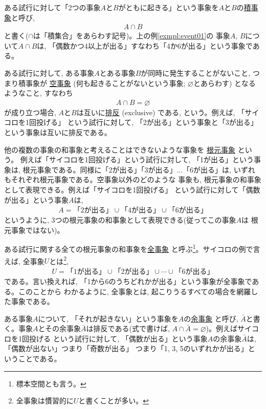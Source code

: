 ある試行に対して「2つの事象$A$と$B$がともに起きる」という事象を$A$と$B$の\underline{積事象}と呼び, 
\begin{eqnarray}A\cap B\label{eq:prodset}\end{eqnarray}
と書く($\cap$は「積集合」をあらわす記号)。上の例\ref{exmpl:event01}の
事象$A$, $B$について$A\cap B$は, 「偶数かつ4以上が出る」すなわち「4か6が出る」という事象である。

ある試行に対して, ある事象$A$とある事象$B$が同時に発生することがないこと, つまり積事象が
\underline{空事象}  (何も起きることがないという事象; $\varnothing$とあらわす)
となるようなこと, すなわち
\begin{eqnarray}
A\cap B=\varnothing\label{eq:stat_event_exclusive_def}
\end{eqnarray}
が成り立つ場合, $A$と$B$は互いに\underline{排反}  (exclusive)
である, という。例えば, 「サイコロを1回投げる」
という試行に対して, 「2が出る」という事象と「3が出る」という事象は互いに排反である。

他の複数の事象の和事象と考えることはできないような事象を
\underline{根元事象} という。
例えば「サイコロを1回投げる」という試行に対して, 「1が出る」という事象は, 
根元事象である。同様に「2が出る」「3が出る」...「6が出る」は, 
いずれもそれぞれ根元事象である。空事象以外のどのような
事象も, 根元事象の和事象として表現できる。例えば「サイコロを1回投げる」
という試行に対して「偶数が出る」という事象$A$は, 
\begin{eqnarray*}
A=\text{「2が出る」} \cup \text{「4が出る」}\cup \text{「6が出る」}
\end{eqnarray*}
というように, 3つの根元事象の和事象として表現できる(従ってこの事象$A$は
根元事象ではない)。

ある試行に関する全ての根元事象の和事象を\underline{全事象}
と呼ぶ\footnote{標本空間とも言う。}。サイコロの例で言えば, 
全事象$U$とは\footnote{全事象は慣習的に$U$と書くことが多い。}, 
\begin{eqnarray*}
U=\text{「1が出る」} \cup \text{「2が出る」}\cup\cdots\cup \text{「6が出る」}
\end{eqnarray*}
である。言い換えれば, 「1から6のうちどれかが出る」という事象が全事象である。このことから
わかるように, 全事象とは, 起こりうるすべての場合を網羅した事象である。

ある事象$A$について, 「それが起きない」という事象を$A$の\underline{余事象} 
と呼び, $\bar{A}$と書く。事象$A$とその余事象$\bar{A}$は排反である(式で書けば, 
$A\cap \bar{A}=\varnothing$)。例えばサイコロを1回投げる
という試行に対して, 「偶数が出る」という事象$A$の余事象$\bar{A}$は, 「偶数が出ない」つまり「奇数が出る」
つまり「1, 3, 5のいずれかが出る」ということである。

